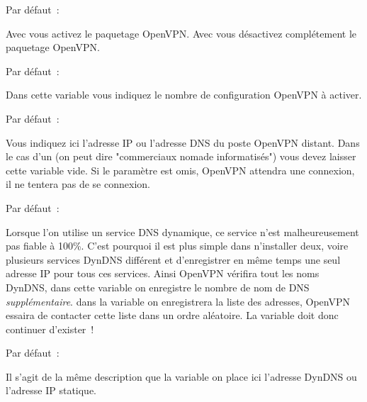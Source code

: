 \begin{description}


  Par défaut~: 

  Avec  vous activez le paquetage OpenVPN. Avec  vous désactivez
  complétement le paquetage OpenVPN.


  Par défaut~: 

  Dans cette variable vous indiquez le nombre de configuration OpenVPN à activer.


  Par défaut~: 

  Vous indiquez ici l'adresse IP ou l'adresse DNS du poste OpenVPN distant. Dans le
  cas d'un  (on peut dire "commerciaux nomade
  informatisés") vous devez laisser cette variable vide. Si le paramètre est omis,
  OpenVPN attendra une connexion, il ne tentera pas de se connexion.


  Par défaut~: 

  Lorsque l'on utilise un service DNS dynamique, ce service n'est malheureusement pas fiable
  à 100\%. C'est pourquoi il est plus simple dans n'installer deux, voire plusieurs services
  DynDNS différent et d'enregistrer en même temps une seul adresse IP pour tous ces services.
  Ainsi OpenVPN vérifira tout les noms DynDNS, dans cette variable on enregistre le nombre
  de nom de DNS \emph{supplémentaire}. dans la variable 
  on enregistrera la liste des adresses, OpenVPN essaira de contacter cette liste dans un
  ordre aléatoire. La variable  doit donc continuer d'exister~!


  Par défaut~: 

  Il s'agit de la même description que la variable 
  on place ici l'adresse DynDNS ou l'adresse IP statique.


\end{description}
